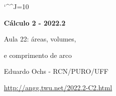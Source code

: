 \documentclass[oneside,12pt]{article}
\begin{document}
\catcode`\^^J=10
\pu
\def\pictgridstyle{\color{GrayPale}\linethickness{0.3pt}}
\def\pictaxesstyle{\linethickness{0.5pt}}
\def\pictnaxesstyle{\color{GrayPale}\linethickness{0.5pt}}
\celllower=2.5pt


\def\u#1{\par{\footnotesize \url{#1}}}

\def\drafturl{http://angg.twu.net/LATEX/2022-2-C2.pdf}
\def\drafturl{http://angg.twu.net/2022.2-C2.html}
\def\draftfooter{\tiny \href{\drafturl}{\jobname{}} \ColorBrown{\shorttoday{} \hours}}



%

\thispagestyle{empty}

\begin{center}

\vspace*{1.2cm}

{\bf \Large Cálculo 2 - 2022.2}

\bsk

Aula 22: áreas, volumes,

e comprimento de arco

\bsk

Eduardo Ochs - RCN/PURO/UFF

\url{http://angg.twu.net/2022.2-C2.html}

\end{center}

\newpage
\end{document}
